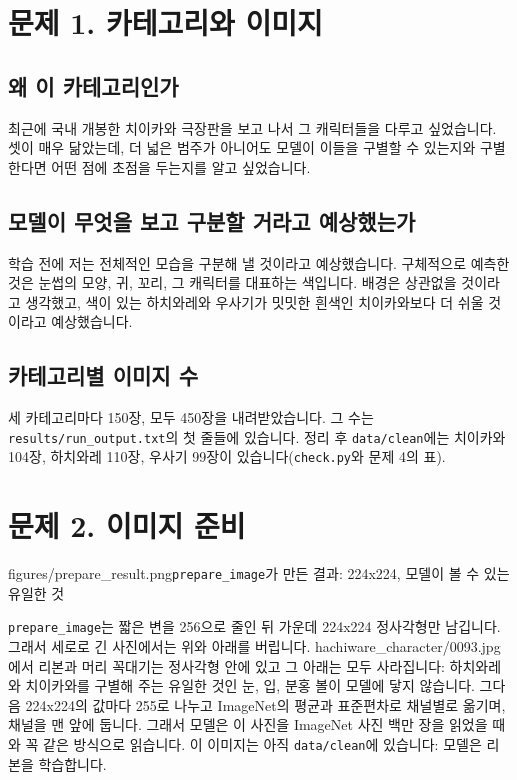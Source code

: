 \documentclass[11pt]{article}
\begin{document}
\makeheader

\section*{문제 1. 카테고리와 이미지}

\subsection*{왜 이 카테고리인가}
최근에 국내 개봉한 치이카와 극장판을 보고 나서 그 캐릭터들을 다루고 싶었습니다.  
셋이 매우 닮았는데, 더 넓은 범주가 아니어도 모델이 이들을 구별할 수 있는지와
구별한다면 어떤 점에 초점을 두는지를 알고 싶었습니다.

\subsection*{모델이 무엇을 보고 구분할 거라고 예상했는가}
학습 전에 저는 전체적인 모습을 구분해 낼 것이라고 예상했습니다.
구체적으로 예측한 것은 눈썹의 모양, 귀, 꼬리, 그 캐릭터를 대표하는
색입니다. 배경은 상관없을 것이라고
생각했고, 색이 있는 하치와레와 우사기가 밋밋한 흰색인 치이카와보다 더 쉬울
것이라고 예상했습니다.

\subsection*{카테고리별 이미지 수}
세 카테고리마다 150장, 모두 450장을 내려받았습니다. 그 수는
\texttt{results/run\_output.txt}의 첫 줄들에 있습니다. 정리 후
\texttt{data/clean}에는 치이카와 104장, 하치와레 110장, 우사기 99장이
있습니다(\texttt{check.py}와 문제 4의 표).

\section*{문제 2. 이미지 준비}

           {figures/prepare_result.png}{\texttt{prepare\_image}가 만든 결과:
224x224, 모델이 볼 수 있는 유일한 것}

\texttt{prepare\_image}는 짧은 변을 256으로 줄인 뒤 가운데 224x224 정사각형만
남깁니다. 그래서 세로로 긴 사진에서는 위와 아래를 버립니다.
hachiware\_character/0093.jpg에서 리본과 머리 꼭대기는 정사각형 안에 있고 그
아래는 모두 사라집니다: 하치와레와 치이카와를 구별해 주는 유일한 것인 눈, 입,
분홍 볼이 모델에 닿지 않습니다. 그다음 224x224의 값마다 255로 나누고
ImageNet의 평균과 표준편차로 채널별로 옮기며, 채널을 맨 앞에 둡니다. 그래서
모델은 이 사진을 ImageNet 사진 백만 장을 읽었을 때와 꼭 같은 방식으로
읽습니다. 이 이미지는 아직 \texttt{data/clean}에 있습니다: 모델은 리본을
학습합니다.
\end{document}
